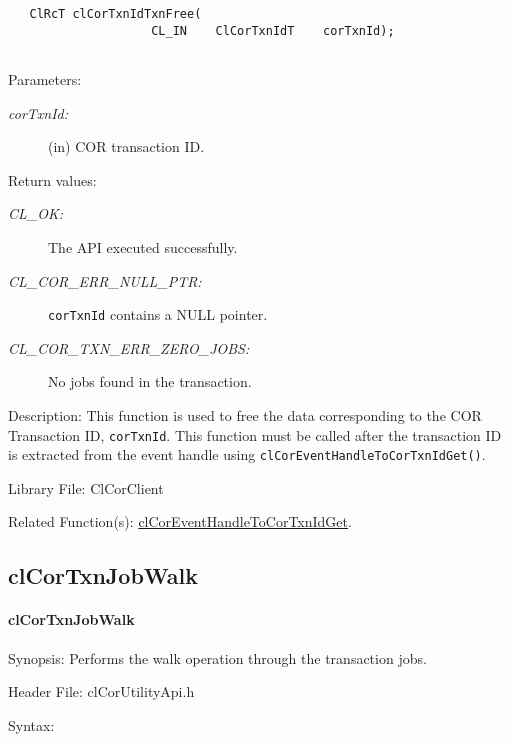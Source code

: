\begin{flushleft}
\begin{Desc}
\footnotesize\begin{verbatim}   ClRcT clCorTxnIdTxnFree(
					CL_IN    ClCorTxnIdT    corTxnId);


\end{verbatim}
\normalsize
\end{Desc}
\begin{Desc}
\item[Parameters:]
\begin{description}
\item[{\em cor\-Txn\-Id:}](in) COR transaction ID.

\end{description}
\end{Desc}
\begin{Desc}
\item[Return values:]
\begin{description}
\item[{\em CL\_\-OK:}]The API executed successfully. 
\item[{\em CL\_\-COR\_\-ERR\_\-NULL\_\-PTR:}] {\tt{corTxnId}} contains a NULL pointer.
\item[{\em CL\_\-COR\_\-TXN\_\-ERR\_\-ZERO\_\-JOBS:}] No jobs found in the transaction.

\end{description}
\end{Desc}
\begin{Desc}
\item[Description:] This function is used to free the data corresponding to the COR Transaction ID, {\tt{corTxnId}}. This function must be called after 
the transaction ID is extracted from the event handle using {\tt{clCorEventHandleToCorTxnIdGet()}}.
\end{Desc}
\begin{Desc}
\item[Library File:]Cl\-Cor\-Client\end{Desc}
\begin{Desc}
\item[Related Function(s):]\hyperlink{pagecor200}{clCorEventHandleToCorTxnIdGet}.
\end{Desc} 	
\newpage




\subsection{clCorTxnJobWalk}
\hypertarget{pagecor205}{}\paragraph{cl\-Cor\-Txn\-Job\-Walk}\label{pagecor205}
\begin{Desc}
\item[Synopsis:] Performs the walk operation through the transaction jobs.
\end{Desc}
\begin{Desc}
\item[Header File:]clCorUtilityApi.h\end{Desc}
\begin{Desc}
\item[Syntax:]


\end{Desc}
\end{flushleft}
